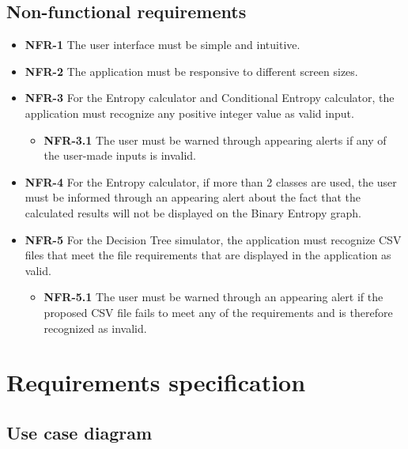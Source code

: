 \subsection{Non-functional requirements}
\begin{itemize}
    \item \textbf{NFR-1} The user interface must be simple and intuitive.
    \item \textbf{NFR-2} The application must be responsive to different screen sizes.
    \item \textbf{NFR-3} For the Entropy calculator and Conditional Entropy calculator, the application must recognize any positive integer value as valid input.
    \begin{itemize}
        \item \textbf{NFR-3.1} The user must be warned through appearing alerts if any of the user-made inputs is invalid.
    \end{itemize}
    \item \textbf{NFR-4} For the Entropy calculator, if more than 2 classes are used, the user must be informed through an appearing alert about the fact that the calculated results will not be displayed on the Binary Entropy graph.
    \item \textbf{NFR-5} For the Decision Tree simulator, the application must recognize CSV files that meet the file requirements that are displayed in the application as valid.
    \begin{itemize}
        \item \textbf{NFR-5.1} The user must be warned through an appearing alert if the proposed CSV file fails to meet any of the requirements and is therefore recognized as invalid.
    \end{itemize}
\end{itemize}

\section{Requirements specification}
\subsection{Use case diagram}

